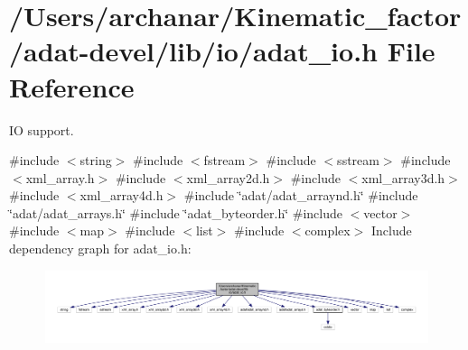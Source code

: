 \hypertarget{adat-devel_2lib_2io_2adat__io_8h}{}\section{/\+Users/archanar/\+Kinematic\+\_\+factor/adat-\/devel/lib/io/adat\+\_\+io.h File Reference}
\label{adat-devel_2lib_2io_2adat__io_8h}


IO support.  


{\ttfamily \#include $<$string$>$}\newline
{\ttfamily \#include $<$fstream$>$}\newline
{\ttfamily \#include $<$sstream$>$}\newline
{\ttfamily \#include $<$xml\+\_\+array.\+h$>$}\newline
{\ttfamily \#include $<$xml\+\_\+array2d.\+h$>$}\newline
{\ttfamily \#include $<$xml\+\_\+array3d.\+h$>$}\newline
{\ttfamily \#include $<$xml\+\_\+array4d.\+h$>$}\newline
{\ttfamily \#include \char`\"{}adat/adat\+\_\+arraynd.\+h\char`\"{}}\newline
{\ttfamily \#include \char`\"{}adat/adat\+\_\+arrays.\+h\char`\"{}}\newline
{\ttfamily \#include \char`\"{}adat\+\_\+byteorder.\+h\char`\"{}}\newline
{\ttfamily \#include $<$vector$>$}\newline
{\ttfamily \#include $<$map$>$}\newline
{\ttfamily \#include $<$list$>$}\newline
{\ttfamily \#include $<$complex$>$}\newline
Include dependency graph for adat\+\_\+io.\+h\+:
\nopagebreak
\begin{figure}[H]
\begin{center}
\leavevmode
\includegraphics[width=350pt]{df/d29/adat-devel_2lib_2io_2adat__io_8h__incl}
\end{center}
\end{figure}
